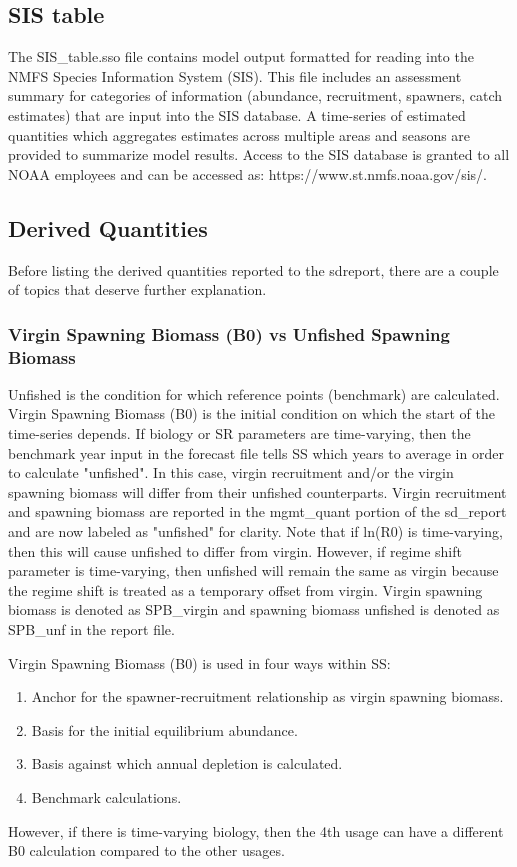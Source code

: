 \subsection{SIS table}
The SIS\_table.sso file contains model output formatted for reading into the NMFS Species Information System (SIS).  This file includes an assessment summary for categories of information (abundance, recruitment, spawners, catch estimates) that are input into the SIS database.  A time-series of estimated quantities which aggregates estimates across multiple areas and seasons are provided to summarize model results.  Access to the SIS database is granted to all NOAA employees and can be accessed as: https://www.st.nmfs.noaa.gov/sis/.

\subsection{Derived Quantities}
Before listing the derived quantities reported to the sdreport, there are a couple of topics that deserve further explanation.

\hypertarget{VirginUnfished}{}
\subsubsection{Virgin Spawning Biomass (B0) vs Unfished Spawning Biomass}
Unfished is the condition for which reference points (benchmark) are calculated.  Virgin Spawning Biomass (B0) is the initial condition on which the start of the time-series depends. If biology or SR parameters are time-varying, then the benchmark year input in the forecast file tells SS which years to average in order to calculate "unfished".  In this case, virgin recruitment and/or the virgin spawning biomass will differ from their unfished counterparts.  Virgin recruitment and spawning biomass are reported in the mgmt\_quant portion of the sd\_report and are now labeled as "unfished" for clarity.  Note that if ln(R0) is time-varying, then this will cause unfished to differ from virgin.  However, if regime shift parameter is time-varying, then unfished will remain the same as virgin because the regime shift is treated as a temporary offset from virgin.  Virgin spawning biomass is denoted as SPB\_virgin and spawning biomass unfished is denoted as SPB\_unf in the report file.

Virgin Spawning Biomass (B0) is used in four ways within SS:
\begin{enumerate}
	\item Anchor for the spawner-recruitment relationship as virgin spawning biomass.
	\item Basis for the initial equilibrium abundance. 
	\item Basis against which annual depletion is calculated.
	\item Benchmark calculations.
\end{enumerate}
However, if there is time-varying biology, then the 4th usage can have a different B0 calculation compared to the other usages.


